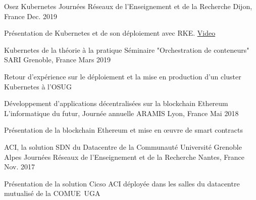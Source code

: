 

\begin{cventries}

  \cventry
    {Osez Kubernetes} %
    {Journées Réseaux de l’Enseignement et de la Recherche} %
    {Dijon, France} %
    {Dec. 2019} %
    {
      \begin{cvitems} %
       \item {Présentation de Kubernetes et de son déploiement avec RKE. \href{https://replay.jres.org/videos/watch/3d20ee77-319e-4855-921e-3767f55b4543}{Video}}
      \end{cvitems}
    }

  \cventry
    {Kubernetes de la théorie à la pratique} %
    {Séminaire "Orchestration de conteneurs" SARI} %
    {Grenoble, France} %
    {Mars 2019} %
    {
      \begin{cvitems} %
        \item {Retour d'expérience sur le déploiement et la mise en production d'un cluster Kubernetes à l'OSUG}
      \end{cvitems}
    }

  \cventry
    {Développement d'applications décentralisées sur la blockchain Ethereum} %
    {L'informatique du futur, Journée annuelle ARAMIS} %
    {Lyon, France} %
    {Mai 2018} %
    {
      \begin{cvitems} %
        \item {Présentation de la blockchain Ethereum et mise en œuvre de smart contracts}
      \end{cvitems}
    }

  \cventry
    {ACI, la solution SDN du Datacentre de la Communauté Université Grenoble Alpes} %
    {Journées Réseaux de l’Enseignement et de la Recherche} %
    {Nantes, France} %
    {Nov. 2017} %
    {
      \begin{cvitems} %
        \item {Présentation de la solution Cicso ACI déployée dans les salles du datacentre mutualisé de la COMUE UGA}
      \end{cvitems}
    }

\end{cventries}
